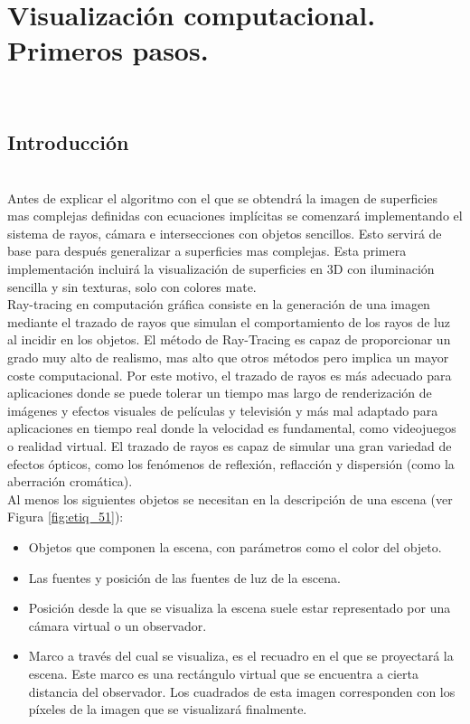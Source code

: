 \chapter{Visualización computacional. Primeros pasos.}

${ }$\\
\section{Introducción}
${ }$\\

Antes de explicar el algoritmo con el que se obtendrá la imagen de superficies mas complejas definidas con ecuaciones implícitas se comenzará implementando el sistema de rayos, cámara e intersecciones con objetos sencillos. Esto servirá de base para después generalizar a superficies mas complejas. Esta primera implementación incluirá la visualización de superficies en 3D con iluminación sencilla y sin texturas, solo con colores mate.
${ }$\\

Ray-tracing en computación gráfica consiste en la generación de una imagen mediante el trazado de rayos que simulan el comportamiento de los rayos de luz al incidir en los objetos. El método de Ray-Tracing es capaz de proporcionar un grado muy alto de realismo, mas alto que otros métodos pero implica un mayor coste computacional. Por este motivo, el trazado de rayos es más adecuado para aplicaciones donde se puede tolerar un tiempo mas largo de renderización de imágenes y efectos visuales de películas y televisión y más mal adaptado para aplicaciones en tiempo real donde la velocidad es fundamental, como videojuegos o realidad virtual. El trazado de rayos es capaz de simular una gran variedad de efectos ópticos, como los fenómenos de reflexión, reflacción y dispersión (como la aberración cromática).
${ }$\\


Al menos los siguientes objetos se necesitan en la descripción de una escena (ver Figura \ref{fig:etiq_51}):
\begin{itemize}
	\item Objetos que componen la escena, con parámetros como el color del objeto.
	\item Las fuentes y posición de las fuentes de luz de la escena.
	\item Posición desde la que se visualiza la escena suele estar representado por una cámara virtual o un observador.
	\item Marco a través del cual se visualiza, es el recuadro en el que se proyectará la escena. Este marco es una rectángulo virtual que se encuentra a cierta distancia del observador. Los cuadrados de esta imagen corresponden con los píxeles de la imagen que se visualizará finalmente.
\end{itemize}
${ }$\\

